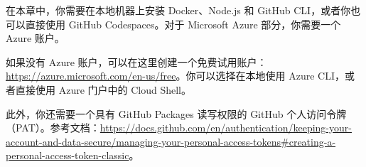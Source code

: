 在本章中，你需要在本地机器上安装 Docker、Node.js 和 GitHub CLI，或者你也可以直接使用 GitHub Codespaces。对于 Microsoft Azure 部分，你需要一个 Azure 账户。

如果没有 Azure 账户，可以在这里创建一个免费试用账户：\url{https://azure.microsoft.com/en-us/free}。你可以选择在本地使用 Azure CLI，或者直接使用 Azure 门户中的 Cloud Shell。

此外，你还需要一个具有 GitHub Packages 读写权限的 GitHub 个人访问令牌（PAT）。参考文档：\url{https://docs.github.com/en/authentication/keeping-your-account-and-data-secure/managing-your-personal-access-tokens#creating-a-personal-access-token-classic}。